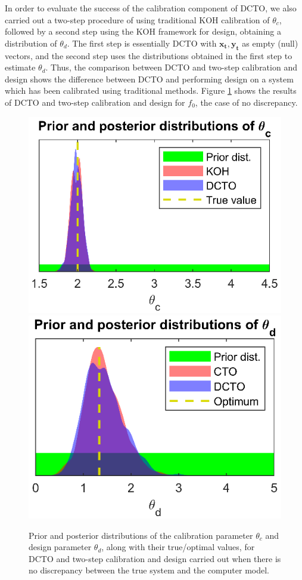 \documentclass[12pt]{article}
\begin{document}
%
In order to evaluate the success of the calibration component of DCTO, we also carried out a two-step procedure of using traditional KOH calibration of $\theta_c$, followed by a second step using the KOH framework for design, obtaining a distribution of $\theta_d$. 
%
The first step is essentially DCTO with $\mathbf{x_t},\mathbf{y_t}$ as empty (null) vectors, and the second step uses the distributions obtained in the first step to estimate $\theta_d$.
%
Thus, the comparison between DCTO and two-step calibration and design shows the difference between DCTO and performing design on a system which has been calibrated using traditional methods.
%
Figure \ref{fig:no_discrep_results} shows the results of DCTO and two-step calibration and design for $f_0$, the case of no discrepancy.
%
\begin{figure}
\centering
\includegraphics[scale=0.85]{FIG_dual_calib_post_theta1-d0}
\includegraphics[scale=0.85]{FIG_dual_calib_post_theta2-d0}
\captionsetup{width=.85\linewidth}
\caption{Prior and posterior distributions of the calibration parameter $\theta_c$ and design parameter $\theta_d$, along with their true/optimal values, for DCTO and two-step calibration and design carried out when there is no discrepancy between the true system and the computer model.}
\label{fig:no_discrep_results}
\end{figure}
\end{document}
